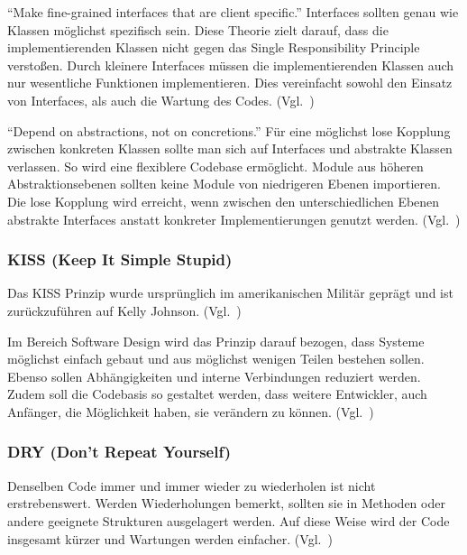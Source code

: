 \enquote{Make fine-grained interfaces that are client specific.}\cite{solid}
Interfaces sollten genau wie Klassen möglichst spezifisch sein.
Diese Theorie zielt darauf, dass die implementierenden Klassen nicht gegen das Single Responsibility Principle verstoßen.
Durch kleinere Interfaces müssen die implementierenden Klassen auch nur wesentliche Funktionen implementieren.
Dies vereinfacht sowohl den Einsatz von Interfaces, als auch die Wartung des Codes.
(Vgl.~\cite{design-patterns-php-laravel})

\enquote{Depend on abstractions, not on concretions.}\cite{solid}
Für eine möglichst lose Kopplung zwischen konkreten Klassen sollte man sich auf Interfaces und abstrakte Klassen verlassen.
So wird eine flexiblere Codebase ermöglicht.
Module aus höheren Abstraktionsebenen sollten keine Module von niedrigeren Ebenen importieren.
Die lose Kopplung wird erreicht, wenn zwischen den unterschiedlichen Ebenen abstrakte Interfaces anstatt konkreter Implementierungen genutzt werden.
(Vgl.~\cite{design-patterns-php-laravel})

\newpage

\subsubsection{KISS (Keep It Simple Stupid)}
Das KISS Prinzip wurde ursprünglich im amerikanischen Militär geprägt und ist zurückzuführen auf Kelly Johnson.
(Vgl.~\cite{kelly-johnson-memoir})

Im Bereich Software Design wird das Prinzip darauf bezogen, dass Systeme möglichst einfach gebaut und aus möglichst wenigen Teilen bestehen sollen.
Ebenso sollen Abhängigkeiten und interne Verbindungen reduziert werden.
Zudem soll die Codebasis so gestaltet werden, dass weitere Entwickler, auch Anfänger, die Möglichkeit haben, sie verändern zu können.
(Vgl.~\cite{kiss-principle-explained})

\subsubsection{DRY (Don’t Repeat Yourself)}
Denselben Code immer und immer wieder zu wiederholen ist nicht erstrebenswert.
Werden Wiederholungen bemerkt, sollten sie in Methoden oder andere geeignete Strukturen ausgelagert werden.
Auf diese Weise wird der Code insgesamt kürzer und Wartungen werden einfacher.
(Vgl.~\cite{the-pragmatic-programmer})

